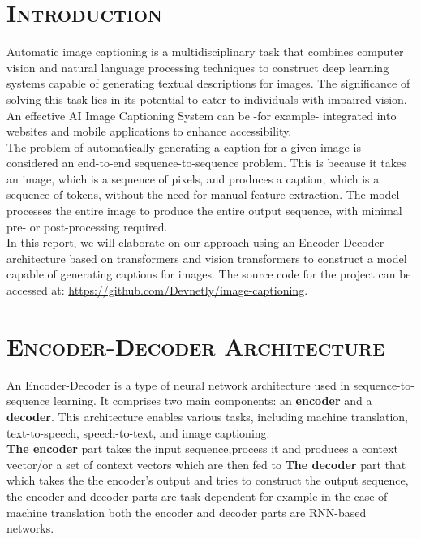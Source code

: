 \documentclass[a4paper,10pt]{article}
\begin{document}
\section{\scshape{Introduction}}

\noindent Automatic image captioning is a multidisciplinary task that combines computer vision and natural language processing techniques to construct deep learning systems capable of generating textual descriptions for images. The significance of solving this task lies in its potential to cater to individuals with impaired vision. An effective AI Image Captioning System can be -for example- integrated into websites and mobile applications to enhance accessibility.\\

\noindent The problem of automatically generating a caption for a given image is considered an end-to-end sequence-to-sequence problem. This is because it takes an image, which is a sequence of pixels, and produces a caption, which is a sequence of tokens, without the need for manual feature extraction. The model processes the entire image to produce the entire output sequence, with minimal pre- or post-processing required.\\

\noindent In this report, we will elaborate on our approach using an Encoder-Decoder architecture based on transformers and vision transformers to construct a model capable of generating captions for images. The source code for the project can be accessed at: \textcolor{blue}{\href{https://github.com/Devnetly/image-captioning}{https://github.com/Devnetly/image-captioning}}.

\section{\scshape{Encoder-Decoder Architecture}}

\noindent An Encoder-Decoder is a type of neural network architecture used in sequence-to-sequence learning. It comprises two main components: an \textbf{encoder} and a \textbf{decoder}. This architecture enables various tasks, including machine translation, text-to-speech, speech-to-text, and image captioning.\\

\noindent \textbf{The encoder} part takes the input sequence,process it and produces a context vector/or a set of context vectors which are then fed to \textbf{The decoder} part that which takes the the encoder's output and tries to construct the output sequence, the encoder and decoder parts are task-dependent for example in the case of machine translation both the encoder and decoder parts are RNN-based networks.\\
\end{document}
